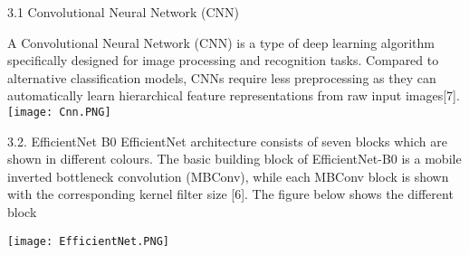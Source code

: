 3.1 Convolutional Neural Network (CNN)
\hfill \

A Convolutional Neural Network (CNN) is a type of deep learning algorithm specifically designed for image processing and recognition tasks. Compared to alternative classification models, CNNs require less preprocessing as they can automatically learn hierarchical feature representations from raw input images[7].
\centering
\texttt{[image: Cnn.PNG]}
\hfill \break

3.2. EfficientNet B0
\hfill \break
EfficientNet architecture consists of seven blocks which are shown in different colours. The basic building block of EfficientNet-B0 is a mobile inverted bottleneck convolution (MBConv), while each MBConv block is shown with the corresponding kernel filter size [6]. The figure below shows the different block

\centering
\texttt{[image: EfficientNet.PNG]}
\hfill \break







